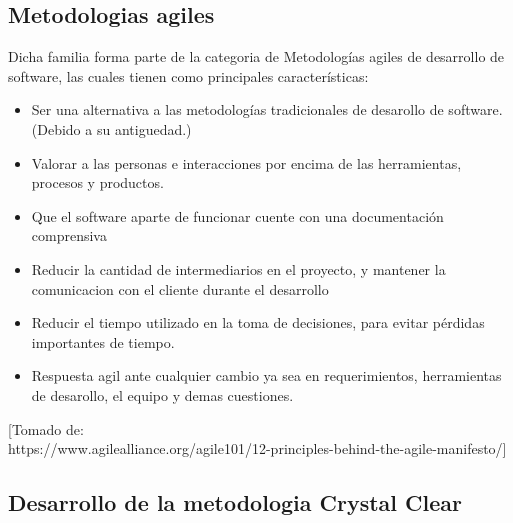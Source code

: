 \documentclass[12pt,a4paper]{article}
\begin{document}
	\subsection*{Metodologias agiles}
	Dicha familia forma parte de la categoria de Metodologías agiles de desarrollo de software, las cuales tienen como principales características:
	\begin{itemize}
		\item Ser una alternativa a las metodologías tradicionales de desarollo de software.\\
		(Debido a su antiguedad.)
		
		\item Valorar a las personas e interacciones por encima de las herramientas, procesos y productos.
		
		\item Que el software aparte de funcionar cuente con una documentación comprensiva
		
		\item Reducir la cantidad de intermediarios en el proyecto, y mantener la comunicacion con el cliente durante el desarrollo
		
		\item Reducir el tiempo utilizado en la toma de decisiones, para evitar pérdidas importantes de tiempo.
		
		\item Respuesta agil ante cualquier cambio ya sea en requerimientos, herramientas de desarollo, el equipo y demas cuestiones.
		\\
	\end{itemize}
	
	
	[Tomado de:\\
	https://www.agilealliance.org/agile101/12-principles-behind-the-agile-manifesto/]\\
	
	\subsection*{Desarrollo de la metodologia Crystal Clear}
		
\end{document}
